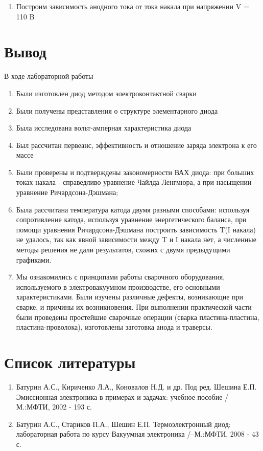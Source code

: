 \documentclass[a4paper]{article}
\begin{document}
\begin{enumerate}
\item Построим зависимость анодного тока от тока накала при напряжении V = 110 B

\end{enumerate}

\section{Вывод}

В ходе лабораторной работы
\begin{enumerate}
    \item Были изготовлен диод методом электроконтактной сварки
    
    \item Были получены представления о структуре элементарного диода

    \item Была исследована вольт-амперная характеристика диода
    
    \item Был рассчитан первеанс, эффективность и отношение заряда электрона к его массе

    \item Были проверены и подтверждены закономерности ВАХ диода: при больших токах накала - справедливо уравнение Чайлда-Ленгмюра, а при насыщении – уравнение Ричардсона-Дэшмана;

    \item Была рассчитана температура катода двумя разными способами: используя сопротивление катода, используя уравнение энергетического баланса, при помощи уравнения Ричардсона-Дэшмана построить зависимость T(I накала) не удалось, так как явной зависимости между T и I накала нет, а численные методы решения не дали результатов, схожих с двумя предыдущими графиками.
    
    \item Мы ознакомились с принципами работы сварочного оборудования, используемого в электровакуумном производстве, его основными характеристиками. Были изучены различные дефекты, возникающие при сварке, и причины их возникновения. При выполнении практической части были проведены простейшие сварочные операции (сварка пластина-пластина, пластина-проволока), изготовлены заготовка анода и траверсы.

\end{enumerate}

\section{Список литературы}
\begin{enumerate}
    \item Батурин А.С., Кириченко Л.А., Коновалов Н.Д. и др. Под ред. Шешина Е.П. Эмиссионная электроника в примерах и задачах: учебное пособие / --М.:МФТИ, 2002 - 193 с. 
    \item Батурин А.С., Стариков П.А., Шешин Е.П. Термоэлектронный диод: лабораторная работа по курсу Вакуумная электроника /--М.:МФТИ, 2008 - 43 с.
\end{enumerate}
\end{document}
